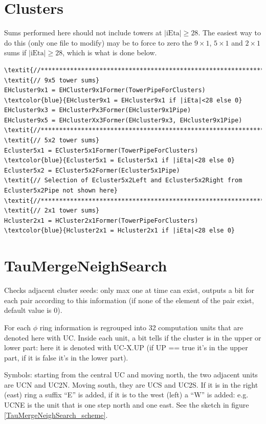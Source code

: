 \documentclass[a4paper, 12pt]{article}
\begin{document}
\section{Clusters}
Sums performed here should not include towers at $|\textrm{iEta}|\geq28$. The easiest way to do this (only one file to modify) may be to force to zero the $9\times1$, $5\times1$ and $2\times1$ sums if $|\textrm{iEta}|\geq28$, which is what is done below.

\begin{Verbatim}[label={Isolation energy sums}]
\textit{//******************************************************************//}
\textit{// 9x5 tower sums}
EHcluster9x1 = EHCluster9x1Former(TowerPipeForClusters)
\textcolor{blue}{EHcluster9x1 = EHcluster9x1 if |iEta|<28 else 0}
EHcluster9x3 = EHclusterPx3Former(EHcluster9x1Pipe)
EHcluster9x5 = EHclusterXx3Former(EHcluster9x3, EHcluster9x1Pipe)
\textit{//******************************************************************//}
\textit{// 5x2 tower sums}
Ecluster5x1 = ECluster5x1Former(TowerPipeForClusters)
\textcolor{blue}{Ecluster5x1 = Ecluster5x1 if |iEta|<28 else 0}
Ecluster5x2 = ECluster5x2Former(Ecluster5x1Pipe)
\textit{// Selection of Ecluster5x2Left and Ecluster5x2Right from Ecluster5x2Pipe not shown here}
\textit{//******************************************************************//}
\textit{// 2x1 tower sums}
Hcluster2x1 = HCluster2x1Former(TowerPipeForClusters)
\textcolor{blue}{Hcluster2x1 = Hcluster2x1 if |iEta|<28 else 0}
\end{Verbatim}


\section{TauMergeNeighSearch}
Checks adjacent cluster seeds: only max one at time can exist, outputs a bit for each pair according to this information
(if none of the element of the pair exist, default value is 0).

For each $\phi$ ring information is regrouped into 32 computation units that are denoted here with UC.
Inside each unit, a bit tells if the cluster is in the upper or lower part: here it is denoted with UC-X.UP (if UP == true it's in
the upper part, if it is false it's in the lower part).

Symbols: starting from the central UC and moving north, the two adjacent units are UCN and UC2N. Moving south, they are UCS and UC2S.
If it is in the right (east) ring a suffix ``E'' is added, if it is to the west (left) a ``W'' is added:
e.g. UCNE is the unit that is one step north and one east. See the sketch in figure \ref{TauMergeNeighSearch_scheme}.
\end{document}
